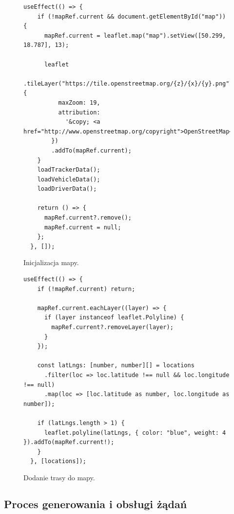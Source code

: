 \begin{figure}
\centering
\begin{lstlisting}
useEffect(() => {
    if (!mapRef.current && document.getElementById("map")) {
      mapRef.current = leaflet.map("map").setView([50.299, 18.787], 13);

      leaflet
        .tileLayer("https://tile.openstreetmap.org/{z}/{x}/{y}.png", {
          maxZoom: 19,
          attribution:
            '&copy; <a href="http://www.openstreetmap.org/copyright">OpenStreetMap</a>',
        })
        .addTo(mapRef.current);
    }
    loadTrackerData();
    loadVehicleData();
    loadDriverData();

    return () => {
      mapRef.current?.remove();
      mapRef.current = null;
    };
  }, []);
\end{lstlisting}
\caption{Inicjalizacja mapy.}
\label{fig:kod:mapInit}
\end{figure}

\begin{figure}
\centering
\begin{lstlisting}
useEffect(() => {
    if (!mapRef.current) return;
  
    mapRef.current.eachLayer((layer) => {
      if (layer instanceof leaflet.Polyline) {
        mapRef.current?.removeLayer(layer);
      }
    });
  
    const latLngs: [number, number][] = locations
      .filter(loc => loc.latitude !== null && loc.longitude !== null)
      .map(loc => [loc.latitude as number, loc.longitude as number]);
  
    if (latLngs.length > 1) {
      leaflet.polyline(latLngs, { color: "blue", weight: 4 }).addTo(mapRef.current!);
    }
  }, [locations]);
\end{lstlisting}
\caption{Dodanie trasy do mapy.}
\label{fig:kod:polyline}
\end{figure}


\subsection{Proces generowania i obsługi żądań}
